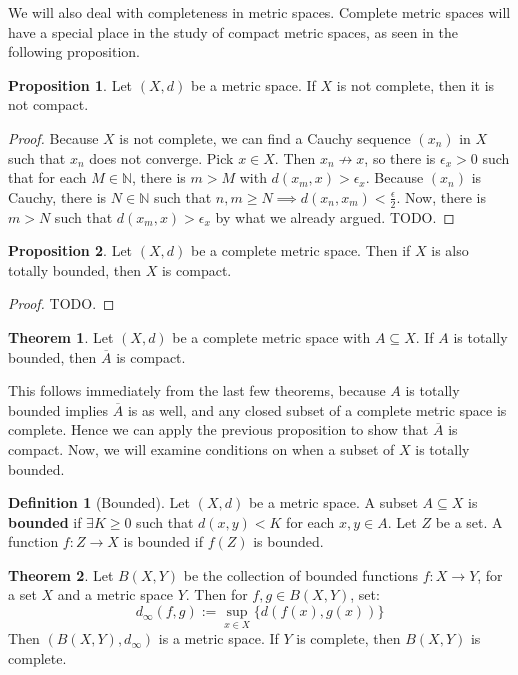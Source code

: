 \documentclass[11pt, oneside]{amsart}   	%
\theoremstyle{definition}
\newtheorem{definition}{Definition}[section]
\newtheorem{theorem}{Theorem}[section]
\newtheorem{prop}{Proposition}[section]
\begin{document}
	We will also deal with completeness in metric spaces. Complete metric spaces will have a special place in the study of 
	compact metric spaces, as seen in the following proposition.
	
	\begin{prop}
		Let $(X, d)$ be a metric space. If $X$ is not complete, then it is not compact.
	\end{prop}
	
	\begin{proof}
		Because $X$ is not complete, we can find a Cauchy sequence $(x_n)$ in $X$ such that $x_n$ does not converge. 
		Pick $x\in X$. Then $x_n\not\rightarrow x$, so there is $\epsilon_x > 0$ such that for each $M\in\mathbb N$, 
		there is $m > M$ with $d(x_m, x) > \epsilon_x$. Because $(x_n)$ is Cauchy, there is $N\in\mathbb N$ such 
		that $n, m\geq N\implies d(x_n, x_m) < \frac{\epsilon}{2}$. Now, there is $m > N$ such that $d(x_m, x) > 
		\epsilon_x$ by what we already argued. TODO.
	\end{proof}
	
	\begin{prop}
		Let $(X, d)$ be a complete metric space. Then if $X$ is also totally bounded, then $X$ is compact.
	\end{prop}
	
	\begin{proof}
		TODO.
	\end{proof}
	
	\begin{theorem}
		Let $(X, d)$ be a complete metric space with $A\subseteq X$. If $A$ is totally bounded, then $\overline A$ is 
		compact.
	\end{theorem}
	
	This follows immediately from the last few theorems, because $A$ is totally bounded implies $\overline A$ is as well, 
	and any closed subset of a complete metric space is complete. Hence we can apply the previous proposition to show 
	that $\overline A$ is compact. Now, we will examine conditions on when a subset of $X$ is totally bounded.
	
	\begin{definition}[Bounded]
		Let $(X, d)$ be a metric space. A subset $A\subseteq X$ is \textbf{bounded} if $\exists K\geq 0$ such 
		that $d(x, y) < K$ for each $x, y\in A$. Let $Z$ be a set. A function $f : Z\rightarrow X$ is bounded if 
		$f(Z)$ is bounded.
	\end{definition}
	
	\begin{theorem}
		Let $B(X, Y)$ be the collection of bounded functions $f : X\rightarrow Y$, for a set $X$ and a 
		metric space $Y$. Then for $f, g\in B(X, Y)$, set:
		$$
			d_\infty (f, g) := \sup_{x\in X}\{d(f(x), g(x))\}
		$$
		Then $(B(X, Y), d_\infty)$ is a metric space. If $Y$ is complete, then $B(X, Y)$ is complete.
	\end{theorem}
	
\end{document}
